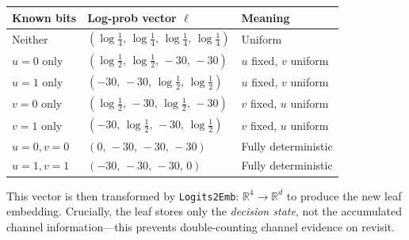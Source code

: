 \documentclass[11pt,a4paper]{article}
\newcommand{\R}{\mathbb{R}}
\begin{document}
\begin{center}
\begin{tabular}{@{}lll@{}}
\toprule
Known bits & Log-prob vector $\ell$ & Meaning \\
\midrule
Neither & $(\log\tfrac{1}{4},\, \log\tfrac{1}{4},\, \log\tfrac{1}{4},\, \log\tfrac{1}{4})$ & Uniform \\
$u{=}0$ only & $(\log\tfrac{1}{2},\, \log\tfrac{1}{2},\, {-}30,\, {-}30)$ & $u$ fixed, $v$ uniform \\
$u{=}1$ only & $({-}30,\, {-}30,\, \log\tfrac{1}{2},\, \log\tfrac{1}{2})$ & $u$ fixed, $v$ uniform \\
$v{=}0$ only & $(\log\tfrac{1}{2},\, {-}30,\, \log\tfrac{1}{2},\, {-}30)$ & $v$ fixed, $u$ uniform \\
$v{=}1$ only & $({-}30,\, \log\tfrac{1}{2},\, {-}30,\, \log\tfrac{1}{2})$ & $v$ fixed, $u$ uniform \\
$u{=}0, v{=}0$ & $(0,\, {-}30,\, {-}30,\, {-}30)$ & Fully deterministic \\
$u{=}1, v{=}1$ & $({-}30,\, {-}30,\, {-}30,\, 0)$ & Fully deterministic \\
\bottomrule
\end{tabular}
\end{center}

This vector is then transformed by \texttt{Logits2Emb}: $\R^4 \to \R^d$ to produce the new leaf embedding.  Crucially, the leaf stores only the \emph{decision state}, not the accumulated channel information---this prevents double-counting channel evidence on revisit.
\end{document}
